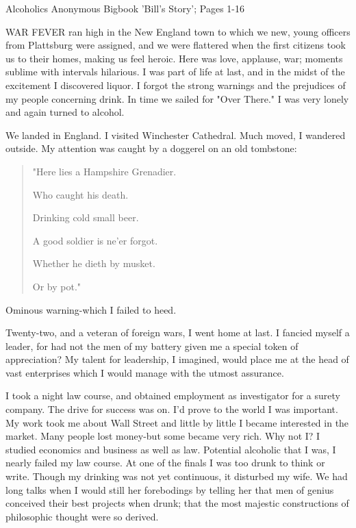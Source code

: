 

Alcoholics Anonymous Bigbook 'Bill's Story'; Pages 1-16


\begin{biblechapter}
    WAR FEVER ran high in the New England town 
    to which we new, young officers from Plattsburg were assigned, 
    and we were flattered when the first citizens took us to their homes, 
    making us feel heroic.
\verse Here was love, applause, war; 
    moments sublime with intervals hilarious.
\verse I was part of life at last, 
    and in the midst of the excitement I discovered liquor.
\verse I forgot the strong warnings 
    and the prejudices of my people concerning drink.
\verse In time we sailed for "Over There."
\verse I was very lonely and again turned to alcohol.

\verse We landed in England.
\verse I visited Winchester Cathedral.
\verse Much moved, I wandered outside.
\verse My attention was caught by a doggerel on an old tombstone:

\verse\begin{quote}"Here lies a Hampshire Grenadier.
    
    Who caught his death.
    
    Drinking cold small beer.
    
    A good soldier is ne'er forgot.
    
    Whether he dieth by musket.
    
    Or by pot."\end{quote}

\verse Ominous warning-which I failed to heed.

\verse Twenty-two, and a veteran of foreign wars, I went home at last.
\verse I fancied myself a leader, 
    for had not the men of my battery given me a special token of appreciation?
\verse My talent for leadership, I imagined, 
    would place me at the head of vast enterprises 
    which I would manage with the utmost assurance.

\verse I took a night law course, 
    and obtained employment as investigator for a surety company.
\verse The drive for success was on.
\verse I'd prove to the world I was important.
\verse My work took me about Wall Street 
    and little by little I became interested in the market.
\verse Many people lost money-but some became very rich.
\verse Why not I?
\verse I studied economics and business as well as law.
\verse Potential alcoholic that I was, I nearly failed my law course.
\verse At one of the finals I was too drunk to think or write.
\verse Though my drinking was not yet continuous, it disturbed my wife.
\verse We had long talks when I would still her forebodings 
    by telling her that men of genius conceived their best projects when drunk; 
    that the most majestic constructions of philosophic thought were so derived.


\end{biblechapter}
